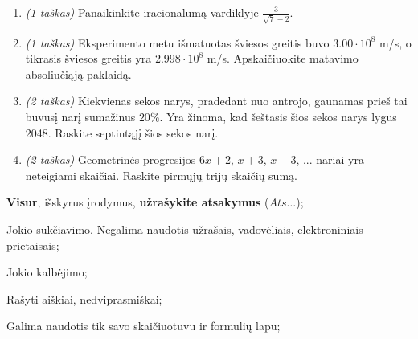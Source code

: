 \documentclass[a4paper]{article}
\begin{document}
\begin{enumerate}
      \item \textit{(1 taškas)} Panaikinkite iracionalumą vardiklyje
            $\frac{3}{\sqrt{7}-2}$.
            \vspace{7mm}

      \item \textit{(1 taškas)}   Eksperimento metu išmatuotas šviesos greitis
            buvo $3.00 \cdot 10^{8}$
            m/s, o tikrasis šviesos greitis yra $2.998 \cdot 10^{8}$ m/s.
            Apskaičiuokite matavimo absoliučiąją paklaidą.
            \vspace{7mm}

      \item \textit{(2 taškas)} Kiekvienas sekos narys, pradedant nuo antrojo,
            gaunamas prieš
            tai
            buvusį narį sumažinus $20\%$. Yra žinoma, kad šeštasis šios sekos
            narys lygus
            2048. Raskite septintąjį šios sekos narį.
            \vspace{7mm}

      \item \textit{(2 taškas)} Geometrinės progresijos $6x+2$, $x+3$, $x-3$,
            ... nariai yra
            neteigiami skaičiai. Raskite pirmųjų trijų skaičių sumą.
            \vspace{7mm}

\end{enumerate}

\begin{small}
      \begin{enumerate*}[label={(\arabic*)}, topsep=0pt, partopsep=0pt]
            \item \textbf{Visur}, išskyrus įrodymus, \textbf{užrašykite
                  atsakymus} ($Ats\ldots$);
            \item Jokio sukčiavimo. Negalima naudotis užrašais, vadovėliais,
            elektroniniais prietaisais;
            \item Jokio kalbėjimo;
            \item Rašyti aiškiai, nedviprasmiškai;
            \item Galima naudotis tik savo skaičiuotuvu ir formulių lapu;
      \end{enumerate*}
\end{small}


\def\width{19}
\def\hauteur{28}

\end{document}
